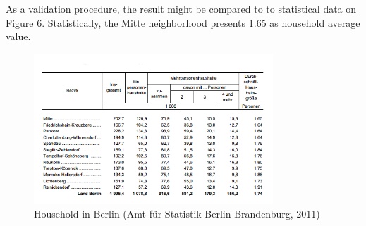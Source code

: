 As a validation procedure, the result might be compared to to statistical data on Figure 6. Statistically, the Mitte neighborhood presents 1.65 as household average value.

\begin{figure}[ht]
	\centering
	\includegraphics[width=0.8\textwidth]{phase1/group3/fig7.png}
	\caption{ Household in Berlin (Amt für Statistik Berlin-Brandenburg, 2011)}
	\label{fig:figure7}
\end{figure}
